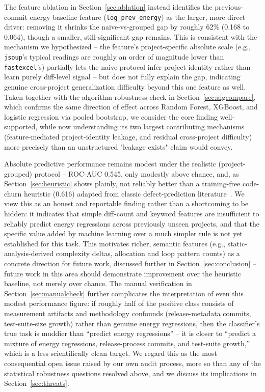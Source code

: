 \documentclass[preprint,12pt]{elsarticle}
\begin{document}
The feature ablation in Section~\ref{sec:ablation} instead identifies the previous-commit energy baseline feature (\texttt{log\_prev\_energy}) as the larger, more direct driver: removing it shrinks the naive-vs-grouped gap by roughly 62\% (0.168 to 0.064), though a smaller, still-significant gap remains. This is consistent with the mechanism we hypothesized -- the feature's project-specific absolute scale (e.g., \texttt{jsoup}'s typical readings are roughly an order of magnitude lower than \texttt{fastexcel}'s) partially lets the naive protocol infer project identity rather than learn purely diff-level signal -- but does not fully explain the gap, indicating genuine cross-project generalization difficulty beyond this one feature as well. Taken together with the algorithm-robustness check in Section~\ref{sec:algcompare}, which confirms the same direction of effect across Random Forest, XGBoost, and logistic regression via pooled bootstrap, we consider the core finding well-supported, while now understanding its two largest contributing mechanisms (feature-mediated project-identity leakage, and residual cross-project difficulty) more precisely than an unstructured "leakage exists" claim would convey.

Absolute predictive performance remains modest under the realistic (project-grouped) protocol -- ROC-AUC 0.545, only modestly above chance, and, as Section~\ref{sec:heuristic} shows plainly, not reliably better than a training-free code-churn heuristic (0.616) adapted from classic defect-prediction literature~\citep{nagappan2005churn}. We view this as an honest and reportable finding rather than a shortcoming to be hidden: it indicates that simple diff-count and keyword features are insufficient to reliably predict energy regressions across previously unseen projects, and that the specific value added by machine learning over a much simpler rule is not yet established for this task. This motivates richer, semantic features (e.g., static-analysis-derived complexity deltas, allocation and loop pattern counts) as a concrete direction for future work, discussed further in Section~\ref{sec:conclusion} -- future work in this area should demonstrate improvement over the heuristic baseline, not merely over chance. The manual verification in Section~\ref{sec:manualcheck} further complicates the interpretation of even this modest performance figure: if roughly half of the positive class consists of measurement artifacts and methodology confounds (release-metadata commits, test-suite-size growth) rather than genuine energy regressions, then the classifier's true task is muddier than ``predict energy regressions'' -- it is closer to ``predict a mixture of energy regressions, release-process commits, and test-suite growth,'' which is a less scientifically clean target. We regard this as the most consequential open issue raised by our own audit process, more so than any of the statistical robustness questions resolved above, and we discuss its implications in Section~\ref{sec:threats}.
\end{document}
